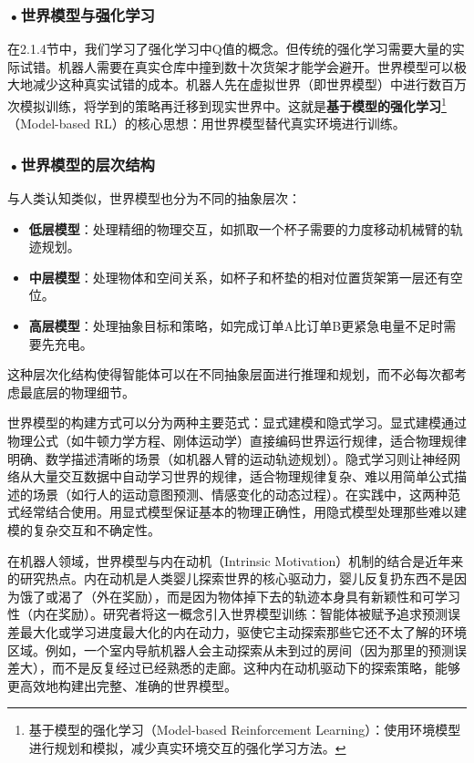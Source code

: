 \subsubsection*{\textbf{•世界模型与强化学习}}

在2.1.4节中，我们学习了强化学习中Q值的概念。但传统的强化学习需要大量的实际试错。机器人需要在真实仓库中撞到数十次货架才能学会避开。世界模型可以极大地减少这种真实试错的成本。机器人先在虚拟世界（即世界模型）中进行数百万次模拟训练，将学到的策略再迁移到现实世界中。这就是\textbf{基于模型的强化学习}\footnote{基于模型的强化学习（Model-based Reinforcement Learning）：使用环境模型进行规划和模拟，减少真实环境交互的强化学习方法。}（Model-based RL）的核心思想：用世界模型替代真实环境进行训练。

\subsubsection*{\textbf{•世界模型的层次结构}}

与人类认知类似，世界模型也分为不同的抽象层次：
\begin{itemize}
\item \textbf{低层模型}：处理精细的物理交互，如抓取一个杯子需要的力度移动机械臂的轨迹规划。
\item \textbf{中层模型}：处理物体和空间关系，如杯子和杯垫的相对位置货架第一层还有空位。
\item \textbf{高层模型}：处理抽象目标和策略，如完成订单A比订单B更紧急电量不足时需要先充电。
\end{itemize}

这种层次化结构使得智能体可以在不同抽象层面进行推理和规划，而不必每次都考虑最底层的物理细节。

世界模型的构建方式可以分为两种主要范式：显式建模和隐式学习。显式建模通过物理公式（如牛顿力学方程、刚体运动学）直接编码世界运行规律，适合物理规律明确、数学描述清晰的场景（如机器人臂的运动轨迹规划）。隐式学习则让神经网络从大量交互数据中自动学习世界的规律，适合物理规律复杂、难以用简单公式描述的场景（如行人的运动意图预测、情感变化的动态过程）。在实践中，这两种范式经常结合使用。用显式模型保证基本的物理正确性，用隐式模型处理那些难以建模的复杂交互和不确定性。

在机器人领域，世界模型与内在动机（Intrinsic Motivation）机制的结合是近年来的研究热点。内在动机是人类婴儿探索世界的核心驱动力，婴儿反复扔东西不是因为饿了或渴了（外在奖励），而是因为物体掉下去的轨迹本身具有新颖性和可学习性（内在奖励）。研究者将这一概念引入世界模型训练：智能体被赋予追求预测误差最大化或学习进度最大化的内在动力，驱使它主动探索那些它还不太了解的环境区域。例如，一个室内导航机器人会主动探索从未到过的房间（因为那里的预测误差大），而不是反复经过已经熟悉的走廊。这种内在动机驱动下的探索策略，能够更高效地构建出完整、准确的世界模型。

